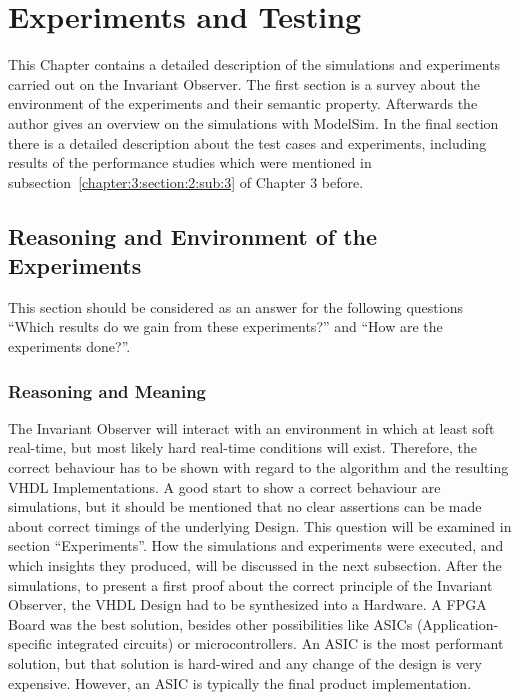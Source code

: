 \chapter{Experiments and Testing}
\label{chapter:4}

\ifpdf
    \graphicspath{{Chapter3/Figs/Raster/}{Chapter3/Figs/PDF/}{Chapter3/Figs/}}
\else
    \graphicspath{{Chapter3/Figs/Vector/}{Chapter3/Figs/}}
\fi

This Chapter contains a detailed description of the simulations and experiments carried out on the Invariant Observer.
The first section is  a survey about the environment of the experiments and their semantic property.
Afterwards the author gives an overview on the simulations with ModelSim.
In the final section there is a detailed description about the test cases and experiments, including results of the performance studies which were
mentioned in subsection~\ref{chapter:3:section:2:sub:3} of Chapter 3 before. \\



\section{Reasoning and Environment of the Experiments}
\label{chapter:4:section:1}
This section should be considered as an answer for the following questions ``Which results do we gain from these experiments?'' and ``How are the experiments done?''. 

\subsection{Reasoning and Meaning}
\label{chapter:4:section:1:subsection:1}
The Invariant Observer will interact with an environment in which at least soft real-time, but most likely hard real-time conditions will exist.
Therefore, the correct behaviour has to be shown with regard to the algorithm and the resulting VHDL Implementations.
A good start to show a correct behaviour are simulations, but it should be mentioned that no clear assertions can be made about correct timings of the underlying Design.
This question will be examined in section ``Experiments''.
How the simulations and experiments were executed, and which insights they produced, will be discussed in the next subsection.
After the simulations, to present a first proof about the correct principle of the Invariant Observer, the VHDL Design had to be synthesized into a Hardware.
A FPGA Board was the best solution, besides other possibilities like ASICs (Application-specific integrated circuits)  or microcontrollers. 
An ASIC is the most performant solution, but that solution is hard-wired and any change of the design is very expensive. 
However, an ASIC is typically the final product implementation.

